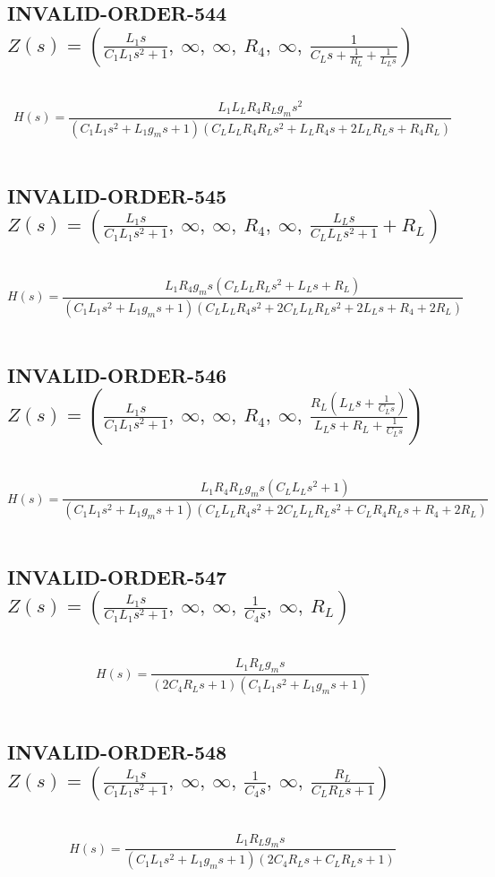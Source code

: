 \documentclass{article}
\begin{document}
\subsection{INVALID-ORDER-544 $Z(s) = \left( \frac{L_{1} s}{C_{1} L_{1} s^{2} + 1}, \  \infty, \  \infty, \  R_{4}, \  \infty, \  \frac{1}{C_{L} s + \frac{1}{R_{L}} + \frac{1}{L_{L} s}}\right)$ } \ 
\textbf{\[H(s) = \frac{L_{1} L_{L} R_{4} R_{L} g_{m} s^{2}}{\left(C_{1} L_{1} s^{2} + L_{1} g_{m} s + 1\right) \left(C_{L} L_{L} R_{4} R_{L} s^{2} + L_{L} R_{4} s + 2 L_{L} R_{L} s + R_{4} R_{L}\right)}\] } \ 
\subsection{INVALID-ORDER-545 $Z(s) = \left( \frac{L_{1} s}{C_{1} L_{1} s^{2} + 1}, \  \infty, \  \infty, \  R_{4}, \  \infty, \  \frac{L_{L} s}{C_{L} L_{L} s^{2} + 1} + R_{L}\right)$ } \ 
\textbf{\[H(s) = \frac{L_{1} R_{4} g_{m} s \left(C_{L} L_{L} R_{L} s^{2} + L_{L} s + R_{L}\right)}{\left(C_{1} L_{1} s^{2} + L_{1} g_{m} s + 1\right) \left(C_{L} L_{L} R_{4} s^{2} + 2 C_{L} L_{L} R_{L} s^{2} + 2 L_{L} s + R_{4} + 2 R_{L}\right)}\] } \ 
\subsection{INVALID-ORDER-546 $Z(s) = \left( \frac{L_{1} s}{C_{1} L_{1} s^{2} + 1}, \  \infty, \  \infty, \  R_{4}, \  \infty, \  \frac{R_{L} \left(L_{L} s + \frac{1}{C_{L} s}\right)}{L_{L} s + R_{L} + \frac{1}{C_{L} s}}\right)$ } \ 
\textbf{\[H(s) = \frac{L_{1} R_{4} R_{L} g_{m} s \left(C_{L} L_{L} s^{2} + 1\right)}{\left(C_{1} L_{1} s^{2} + L_{1} g_{m} s + 1\right) \left(C_{L} L_{L} R_{4} s^{2} + 2 C_{L} L_{L} R_{L} s^{2} + C_{L} R_{4} R_{L} s + R_{4} + 2 R_{L}\right)}\] } \ 
\subsection{INVALID-ORDER-547 $Z(s) = \left( \frac{L_{1} s}{C_{1} L_{1} s^{2} + 1}, \  \infty, \  \infty, \  \frac{1}{C_{4} s}, \  \infty, \  R_{L}\right)$ } \ 
\textbf{\[H(s) = \frac{L_{1} R_{L} g_{m} s}{\left(2 C_{4} R_{L} s + 1\right) \left(C_{1} L_{1} s^{2} + L_{1} g_{m} s + 1\right)}\] } \ 
\subsection{INVALID-ORDER-548 $Z(s) = \left( \frac{L_{1} s}{C_{1} L_{1} s^{2} + 1}, \  \infty, \  \infty, \  \frac{1}{C_{4} s}, \  \infty, \  \frac{R_{L}}{C_{L} R_{L} s + 1}\right)$ } \ 
\textbf{\[H(s) = \frac{L_{1} R_{L} g_{m} s}{\left(C_{1} L_{1} s^{2} + L_{1} g_{m} s + 1\right) \left(2 C_{4} R_{L} s + C_{L} R_{L} s + 1\right)}\] } \ 
\end{document}

